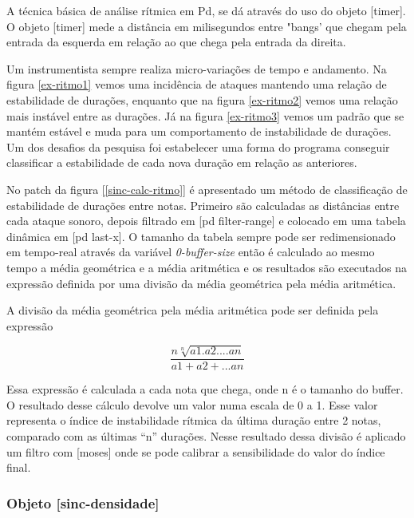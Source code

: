 \documentclass{ppgmus}
\begin{document}
A técnica básica de análise rítmica em Pd, se dá através do uso do objeto [timer].
O objeto [timer] mede a distância em milisegundos entre "bangs' que chegam pela entrada
da esquerda em relação ao que chega pela entrada da direita.%


Um instrumentista sempre realiza micro-variações de tempo e andamento.
Na figura \ref{ex-ritmo1} vemos uma incidência de ataques mantendo uma relação de estabilidade
de durações, enquanto que na figura \ref{ex-ritmo2} vemos uma relação mais instável
entre as durações. Já na figura \ref{ex-ritmo3} vemos um padrão que se mantém estável e 
muda para um comportamento de instabilidade de durações. Um dos desafios da pesquisa
foi estabelecer uma forma do programa conseguir classificar a estabilidade de cada nova duração em relação
as anteriores.

No patch da figura \ref{[sinc-calc-ritmo]} é apresentado um método de classificação de estabilidade
de durações entre notas. Primeiro são calculadas as distâncias entre cada ataque
sonoro, depois filtrado em [pd filter-range] e colocado em uma tabela dinâmica em
[pd last-x]. O tamanho da tabela sempre pode ser redimensionado em tempo-real através
da variável \textit{0-buffer-size} então é calculado ao mesmo tempo a média geométrica
e a média aritmética e os resultados são executados na expressão definida por uma
divisão da média geométrica pela média aritmética. %


A divisão da média geométrica pela média aritmética pode ser definida pela expressão

\begin{equation}
\frac{n\sqrt[n]{a1.a2....an}}{a1+a2+...an} 
\end{equation}  

Essa expressão é calculada a cada nota que chega, onde n é o tamanho do buffer.
O resultado desse cálculo devolve um valor numa escala de 0 a 1.
Esse valor representa o índice de instabilidade rítmica da última duração entre 2 notas,
comparado com as últimas ``n'' durações.
Nesse resultado dessa divisão é aplicado um filtro com [moses] onde se pode calibrar
a sensibilidade do valor do índice final.


\subsubsection{Objeto [sinc-densidade]}

\end{document}
